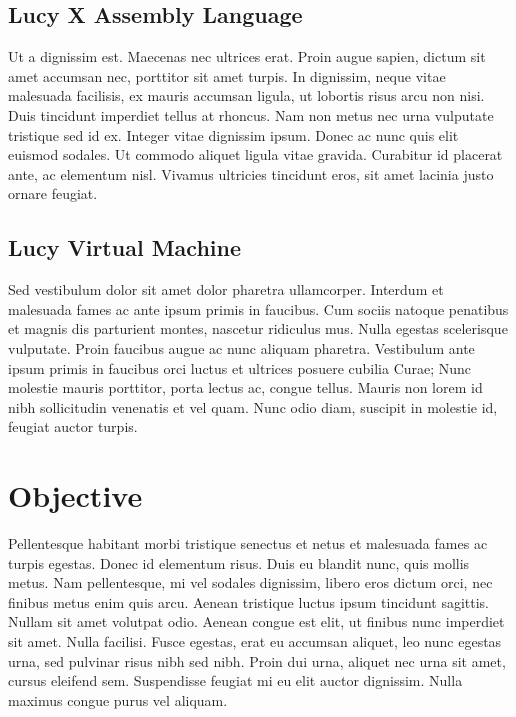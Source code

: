 \subsection{Lucy X Assembly Language}
Ut a dignissim est. Maecenas nec ultrices erat. Proin augue sapien, dictum sit amet accumsan nec, porttitor sit amet turpis. In dignissim, neque vitae malesuada facilisis, ex mauris accumsan ligula, ut lobortis risus arcu non nisi. Duis tincidunt imperdiet tellus at rhoncus. Nam non metus nec urna vulputate tristique sed id ex. Integer vitae dignissim ipsum. Donec ac nunc quis elit euismod sodales. Ut commodo aliquet ligula vitae gravida. Curabitur id placerat ante, ac elementum nisl. Vivamus ultricies tincidunt eros, sit amet lacinia justo ornare feugiat.

\subsection{Lucy Virtual Machine}
Sed vestibulum dolor sit amet dolor pharetra ullamcorper. Interdum et malesuada fames ac ante ipsum primis in faucibus. Cum sociis natoque penatibus et magnis dis parturient montes, nascetur ridiculus mus. Nulla egestas scelerisque vulputate. Proin faucibus augue ac nunc aliquam pharetra. Vestibulum ante ipsum primis in faucibus orci luctus et ultrices posuere cubilia Curae; Nunc molestie mauris porttitor, porta lectus ac, congue tellus. Mauris non lorem id nibh sollicitudin venenatis et vel quam. Nunc odio diam, suscipit in molestie id, feugiat auctor turpis.


\section{Objective}
Pellentesque habitant morbi tristique senectus et netus et malesuada fames ac turpis egestas. Donec id elementum risus. Duis eu blandit nunc, quis mollis metus. Nam pellentesque, mi vel sodales dignissim, libero eros dictum orci, nec finibus metus enim quis arcu. Aenean tristique luctus ipsum tincidunt sagittis. Nullam sit amet volutpat odio. Aenean congue est elit, ut finibus nunc imperdiet sit amet. Nulla facilisi. Fusce egestas, erat eu accumsan aliquet, leo nunc egestas urna, sed pulvinar risus nibh sed nibh. Proin dui urna, aliquet nec urna sit amet, cursus eleifend sem. Suspendisse feugiat mi eu elit auctor dignissim. Nulla maximus congue purus vel aliquam.
